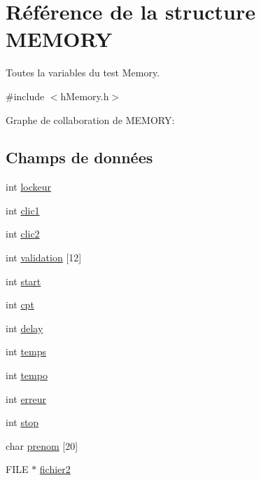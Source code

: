 \hypertarget{struct_m_e_m_o_r_y}{}\section{Référence de la structure M\+E\+M\+O\+RY}
\label{struct_m_e_m_o_r_y}


Toutes la variables du test Memory.  




{\ttfamily \#include $<$h\+Memory.\+h$>$}



Graphe de collaboration de M\+E\+M\+O\+RY\+:
\subsection*{Champs de données}
\begin{DoxyCompactItemize}
\item 
int \hyperlink{struct_m_e_m_o_r_y_afaf951f31958ae29b257a200d1097ae0}{lockeur}
\item 
int \hyperlink{struct_m_e_m_o_r_y_aa6bcbbf0ed10325dfe7fce1e61e7c9ed}{clic1}
\item 
int \hyperlink{struct_m_e_m_o_r_y_a68f0f859c6ae5c991ec4e5f0b98d93e9}{clic2}
\item 
int \hyperlink{struct_m_e_m_o_r_y_ad6bce5091c086d15a76e7d0610a01507}{validation} \mbox{[}12\mbox{]}
\item 
int \hyperlink{struct_m_e_m_o_r_y_a29f694b7714a58d55e9b7c06480c9b93}{start}
\item 
int \hyperlink{struct_m_e_m_o_r_y_a91c7367ce7eb09e409da16ec4d733313}{cpt}
\item 
int \hyperlink{struct_m_e_m_o_r_y_a9930314917a947ebc150ea3e96ab752a}{delay}
\item 
int \hyperlink{struct_m_e_m_o_r_y_a7d203f387ea4eb67c8102e8e87ff8fd1}{temps}
\item 
int \hyperlink{struct_m_e_m_o_r_y_a4f79ed479e9443011fb8aae0244fadd0}{tempo}
\item 
int \hyperlink{struct_m_e_m_o_r_y_af86682453d5ac761179a10bf220efcda}{erreur}
\item 
int \hyperlink{struct_m_e_m_o_r_y_aeebed2e935c7e36b7ee23a5f699dae0b}{stop}
\item 
char \hyperlink{struct_m_e_m_o_r_y_a198da4f63995c7110ed3e42fdc32f7d9}{prenom} \mbox{[}20\mbox{]}
\item 
F\+I\+LE $\ast$ \hyperlink{struct_m_e_m_o_r_y_afabf30b4fcf1f06c4cf47eaf628cdcf8}{fichier2}
\item 

\end{DoxyCompactItemize}
